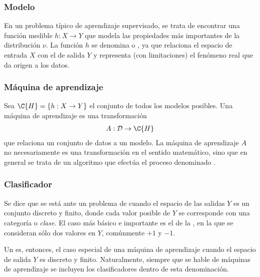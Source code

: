\subsubsection{Modelo}
%
En un problema típico de aprendizaje supervisado, se trata de
encontrar una función medible $h:X\rightarrow{}Y$ que {modela} las
propiedades más importantes de la distribución $\nu$. La función $h$
se denomina  o , ya que relaciona el espacio de
entrada $X$ con el de salida $Y$ y representa (con limitaciones) el
fenómeno real que da origen a los datos.
%
\subsubsection{Máquina de aprendizaje}
%
Sea $\C{H}=\{h:X\rightarrow Y\}$ el conjunto de todos los modelos
posibles. Una máquina de aprendizaje es una transformación
%
\begin{align}
  A:\mathcal{D}\rightarrow\C{H}
  \label{eq:maqaprendizaje}
\end{align}
%
que relaciona un conjunto de datos a un modelo.
La máquina de aprendizaje $A$ no necesariamente es una transformación
en el sentido matemático, sino que en general se trata de un algoritmo
que efectúa el proceso denominado .
%
\subsubsection{Clasificador}
%
Se dice que se está ante un problema de  cuando el
espacio de las salidas $Y$ es un conjunto discreto y finito, donde
cada valor posible de $Y$ se corresponde con una categoría o
\emph{clase}. El caso más básico e importante es el de la
, en la que se consideran sólo dos valores en
$Y$, comúnmente $+1$ y $-1$.

Un  es, entonces, el caso especial de una máquina de
aprendizaje cuando el espacio de salida $Y$ es discreto y finito.
Naturalmente, siempre que se hable de máquinas de aprendizaje se
incluyen los clasificadores dentro de esta denominación.
%
